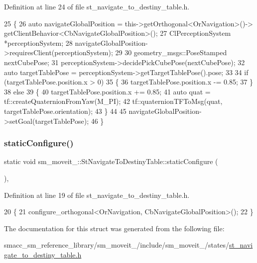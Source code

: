 Definition at line 24 of file st\+\_\+navigate\+\_\+to\+\_\+destiny\+\_\+table.\+h.


\begin{DoxyCode}
25         \{
26             \textcolor{keyword}{auto} navigateGlobalPosition = this->getOrthogonal<OrNavigation>()->
      getClientBehavior<CbNavigateGlobalPosition>();
27             ClPerceptionSystem *perceptionSystem;
28             navigateGlobalPosition->requiresClient(perceptionSystem);
29 
30             geometry\_msgs::PoseStamped nextCubePose;
31             perceptionSystem->decidePickCubePose(nextCubePose);
32             \textcolor{keyword}{auto} targetTablePose = perceptionSystem->getTargetTablePose().pose;
33 
34             \textcolor{keywordflow}{if} (targetTablePose.position.x > 0)
35             \{
36                 targetTablePose.position.x -= 0.85;   
37             \}
38             \textcolor{keywordflow}{else}
39             \{
40                 targetTablePose.position.x += 0.85;
41                 \textcolor{keyword}{auto} quat = tf::createQuaternionFromYaw(M\_PI);
42                 tf::quaternionTFToMsg(quat, targetTablePose.orientation);
43             \}
44 
45             navigateGlobalPosition->setGoal(targetTablePose);
46         \}
\end{DoxyCode}
\mbox{\label{structsm__moveit__4_1_1StNavigateToDestinyTable_a2a53aaa5ef99206441170e41e59462e9}} 
\subsubsection{\texorpdfstring{static\+Configure()}{staticConfigure()}}
{\footnotesize\ttfamily static void sm\+\_\+moveit\+\_\+::\+St\+Navigate\+To\+Destiny\+Table\+::static\+Configure (\begin{DoxyParamCaption}{ }\end{DoxyParamCaption})\hspace{0.3cm}{\ttfamily [inline]}, {\ttfamily [static]}}



Definition at line 19 of file st\+\_\+navigate\+\_\+to\+\_\+destiny\+\_\+table.\+h.


\begin{DoxyCode}
20         \{
21             configure\_orthogonal<OrNavigation, CbNavigateGlobalPosition>();
22         \}
\end{DoxyCode}


The documentation for this struct was generated from the following file\+:\begin{DoxyCompactItemize}
\item 
smacc\+\_\+sm\+\_\+reference\+\_\+library/sm\+\_\+moveit\+\_/include/sm\+\_\+moveit\+\_/states/\hyperlink{st__navigate__to__destiny__table_8h}{st\+\_\+navigate\+\_\+to\+\_\+destiny\+\_\+table.\+h}\end{DoxyCompactItemize}
